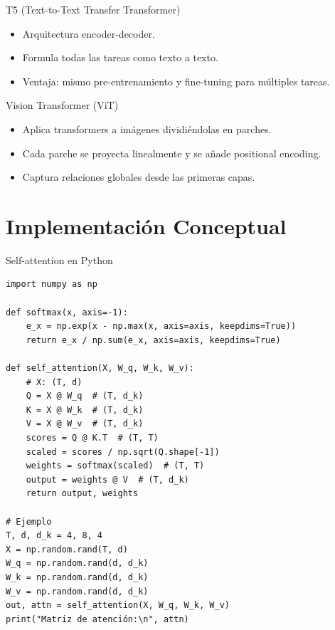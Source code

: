 \documentclass[aspectratio=169, 10pt, xcolor=table]{beamer}
\begin{document}
\begin{frame}{T5 (Text-to-Text Transfer Transformer)}
    \begin{itemize}
        \item Arquitectura encoder-decoder.
        \item Formula todas las tareas como texto a texto.
        \item Ventaja: mismo pre-entrenamiento y fine-tuning para múltiples tareas.
    \end{itemize}
\end{frame}

\begin{frame}{Vision Transformer (ViT)}
    \begin{itemize}
        \item Aplica transformers a imágenes dividiéndolas en parches.
        \item Cada parche se proyecta linealmente y se añade positional encoding.
        \item Captura relaciones globales desde las primeras capas.
    \end{itemize}
\end{frame}

\section{Implementación Conceptual}

\begin{frame}[fragile]{Self-attention en Python}
    \begin{lstlisting}
import numpy as np

def softmax(x, axis=-1):
    e_x = np.exp(x - np.max(x, axis=axis, keepdims=True))
    return e_x / np.sum(e_x, axis=axis, keepdims=True)

def self_attention(X, W_q, W_k, W_v):
    # X: (T, d)
    Q = X @ W_q  # (T, d_k)
    K = X @ W_k  # (T, d_k)
    V = X @ W_v  # (T, d_k)
    scores = Q @ K.T  # (T, T)
    scaled = scores / np.sqrt(Q.shape[-1])
    weights = softmax(scaled)  # (T, T)
    output = weights @ V  # (T, d_k)
    return output, weights

# Ejemplo
T, d, d_k = 4, 8, 4
X = np.random.rand(T, d)
W_q = np.random.rand(d, d_k)
W_k = np.random.rand(d, d_k)
W_v = np.random.rand(d, d_k)
out, attn = self_attention(X, W_q, W_k, W_v)
print("Matriz de atención:\n", attn)
    \end{lstlisting}
\end{frame}
\end{document}
